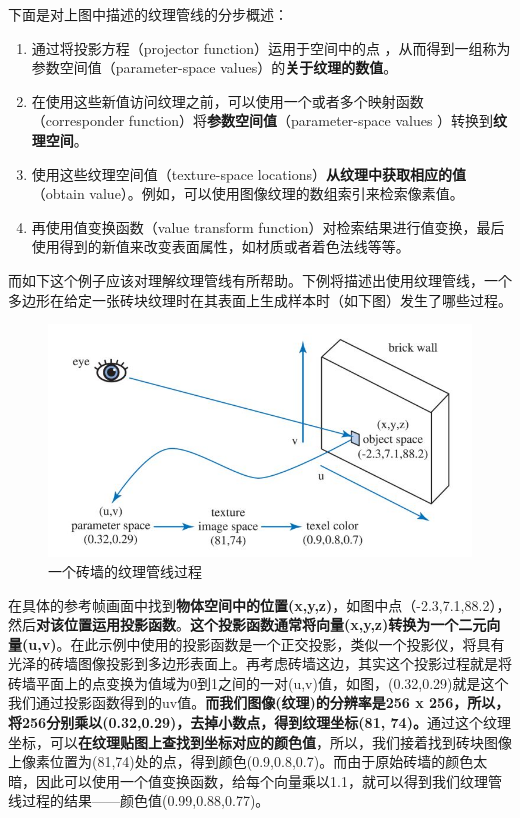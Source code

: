 \documentclass[UTF8,a4paper,12pt]{ctexbook}
\begin{document}
		下面是对上图中描述的纹理管线的分步概述：
			\begin{enumerate}[itemindent = 2em]
				\item 通过将投影方程（projector function）运用于空间中的点 ，从而得到一组称为参数空间值（parameter-space values）的\textbf{关于纹理的数值}。
				\item 在使用这些新值访问纹理之前，可以使用一个或者多个映射函数（corresponder function）将\textbf{参数空间值}（parameter-space values ）转换到\textbf{纹理空间}。
				\item 使用这些纹理空间值（texture-space locations）\textbf{从纹理中获取相应的值}（obtain value）。例如，可以使用图像纹理的数组索引来检索像素值。
				\item 再使用值变换函数（value transform function）对检索结果进行值变换，最后使用得到的新值来改变表面属性，如材质或者着色法线等等。
			\end{enumerate}

		而如下这个例子应该对理解纹理管线有所帮助。下例将描述出使用纹理管线，一个多边形在给定一张砖块纹理时在其表面上生成样本时（如下图）发生了哪些过程。
			\begin{figure}[H]
				\centering
				\includegraphics[scale=0.67]{TexturePipeline2}
				\caption{一个砖墙的纹理管线过程}
			\end{figure}
		
		在具体的参考帧画面中找到\textbf{物体空间中的位置(x,y,z)}，如图中点（-2.3,7.1,88.2），然后\textbf{对该位置运用投影函数}。\color{blue}\textbf{这个投影函数通常将向量(x,y,z)转换为一个二元向量(u,v)}\color{black}。在此示例中使用的投影函数是一个正交投影，类似一个投影仪，将具有光泽的砖墙图像投影到多边形表面上。再考虑砖墙这边，其实这个投影过程就是将砖墙平面上的点变换为值域为0到1之间的一对(u,v)值，如图，(0.32,0.29)就是这个我们通过投影函数得到的uv值。\textbf{而我们图像(纹理)的分辨率是256 x 256，所以，将256分别乘以(0.32,0.29)，去掉小数点，得到纹理坐标(81, 74)。}通过这个纹理坐标，可以\textbf{在纹理贴图上查找到坐标对应的颜色值}，所以，我们接着找到砖块图像上像素位置为(81,74)处的点，得到颜色(0.9,0.8,0.7)。而由于原始砖墙的颜色太暗，因此可以使用一个值变换函数，给每个向量乘以1.1，就可以得到我们纹理管线过程的结果——颜色值(0.99,0.88,0.77)。
		
\end{document}
